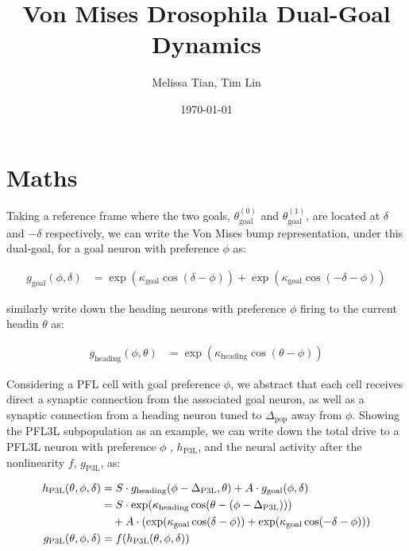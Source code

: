 \documentclass[11pt,a4paper]{article}
\title{Von Mises Drosophila Dual-Goal Dynamics}
\author{Melissa Tian, Tim Lin}
\date{\today}
\begin{document}
\maketitle
{}

\section{Maths}%
  \label{sec:Maths}

  Taking a reference frame where the two goals, $\theta_{\mathrm{goal}}^{(0)}$ and $\theta_{\mathrm{goal}}^{(1)}$, are located at $\delta$ and $-\delta$ respectively, we can write the Von Mises bump representation, under this dual-goal, for a goal neuron with preference $\phi$ as:  

  \begin{align}
    g _{\mathrm{goal}}(\phi, \delta) &= \exp(\kappa_{\mathrm{goal}} \cos(\delta - \phi)) + \exp(\kappa_{\mathrm{goal}} \cos(-\delta - \phi)) 
  \end{align}

  similarly write down the heading neurons with preference $\phi$ firing to the current headin $\theta$ as: 

  \begin{align}
    g_{\mathrm{heading}}(\phi, \theta) &= \exp(\kappa_{\mathrm{heading}} \cos(\theta - \phi))
  \end{align}

  Considering a PFL cell with goal preference $\phi$, we abstract that each cell receives direct a synaptic connection from the associated goal neuron, as well as a synaptic connection from a heading neuron tuned to $\Delta_{\mathrm{pop}}$ away from $\phi$. Showing the PFL3L subpopulation as an example, we can write down the total drive to a PFL3L neuron with preference $\phi$ , $h_{\mathrm{P3L}}$, and the neural activity after the nonlinearity $f$, $g_{\mathrm{P3L}}$, as:

  \begin{align}
    h_{\mathrm{P3L}}(\theta, \phi, \delta) &= S \cdot g_{\mathrm{heading}}(\phi - \Delta_{\mathrm{P3L}}, \theta)  + A \cdot g_{\mathrm{goal}}(\phi, \delta) \notag \\
    & = S \cdot \exp(\kappa_{\mathrm{heading}} \cos(\theta - (\phi - \Delta_{\mathrm{P3L}}))) \notag  \\
    & \quad + A \cdot (\exp(\kappa_{\mathrm{goal}} \cos(\delta - \phi)) + \exp(\kappa_{\mathrm{goal}} \cos(-\delta - \phi))) \notag \\
    g_{\mathrm{P3L}}(\theta, \phi, \delta) &= f(h_{\mathrm{P3L}}(\theta, \phi, \delta)) \label{eq:P3L}
  \end{align}
\end{document}
